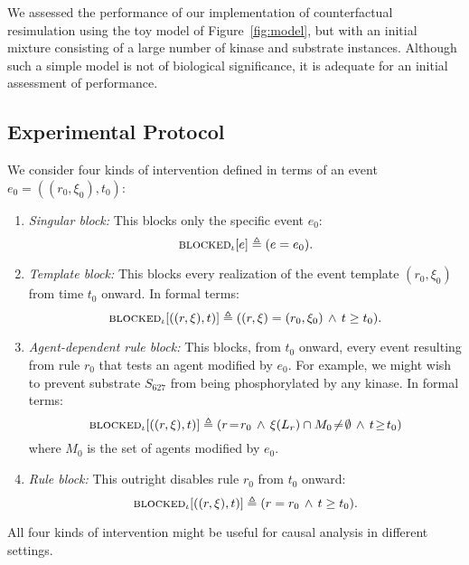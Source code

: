 
\newcommand{\subs}[2]{#1_{\textsf{#2}}}

We assessed the performance of our implementation of counterfactual
resimulation using the toy model of Figure~\ref{fig:model}, but with an initial
mixture consisting of a large number of kinase and substrate instances. Although
such a simple model is not of biological significance, it is adequate for an
initial assessment of performance.

\subsection{Experimental Protocol}

We consider four kinds of intervention defined in terms of an event
$e_0=((r_0, \xi_0), t_0)$:
\begin{enumerate}[leftmargin=0.4cm]
\item \textit{Singular block:} This blocks only the specific event $e_0$:
\[{\textsc{blocked}}_{\iota}[e] \triangleq (e = e_0).\]
\item \textit{Template block:} This blocks every realization of the event template $(r_0, \xi_0)$ from time $t_0$ onward. In formal terms:
\[{\textsc{blocked}}_{\iota}[((r, \xi), t)] \triangleq ((r, \xi) = (r_0, \xi_0)
\,\wedge\, t \geq t_0).\]
\item \textit{Agent-dependent rule block:} This blocks, from
$t_0$ onward, every event resulting from rule $r_0$ that tests an agent
modified by $e_0$. For example, we might wish to prevent substrate $S_{627}$ from being phosphorylated by any kinase. In formal terms: \[{\textsc{blocked}}_{\iota}[((r, \xi), t)] \triangleq (r \!=\! r_0 \,\wedge\, \xi(L_r)\cap M_0 \!\neq\! \emptyset \,\wedge\, t \!\geq\! t_0)\] where $M_0$ is the set of agents modified by $e_0$.
\item \textit{Rule block:} This outright disables rule
$r_0$ from $t_0$ onward:
\[{\textsc{blocked}}_{\iota}[((r, \xi), t)] \triangleq (r = r_0 \,\wedge\, t \geq t_0).\]
\end{enumerate}
All four kinds of intervention might be useful for causal analysis in
different settings.

